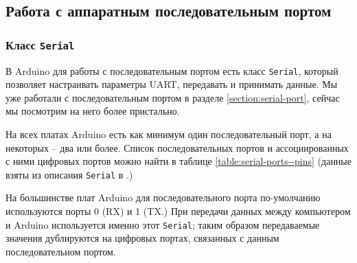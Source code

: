 \documentclass[../sparc.tex]{subfiles}
\begin{document}

\subsection{Работа с аппаратным последовательным портом}

\subsubsection{Класс \texttt{Serial}}

В Arduino для работы с последовательным портом есть класс \texttt{Serial},
который позволяет настраивать параметры UART, передавать и принимать данные.  Мы
уже работали с последовательным портом в разделе \ref{section:serial-port},
сейчас мы посмотрим на него более пристально.

На всех платах Arduino есть как минимум один последовательный порт, а на
некоторых -- два или более.  Список последовательных портов и ассоциированных с
ними цифровых портов можно найти в таблице \ref{table:serial-ports--pins} (данные
взяты из описания \texttt{Serial} в \cite{arduino:reference}.)


На большинстве плат Arduino для последовательного порта по-умолчанию
используются порты 0 (RX) и 1 (TX.)  При передачи данных между компьютером и
Arduino используется именно этот \texttt{Serial}; таким образом передаваемые
значения дублируются на цифровых портах, связанных с данным последовательном
портом.
\end{document}
